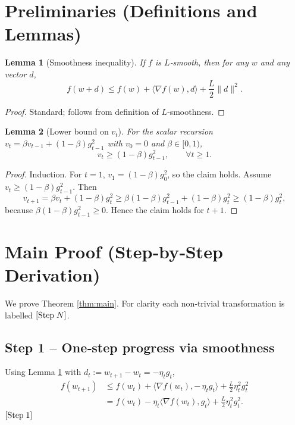 \documentclass{article}
\newtheorem{lemma}{Lemma}
\begin{document}
\newpage

\section*{Preliminaries (Definitions and Lemmas)}
\begin{lemma}[Smoothness inequality]\label{lem:smooth}
If $f$ is $L$‑smooth, then for any $w$ and any vector $d$,
\[
f(w+d) \le f(w)+\langle\nabla f(w),d\rangle+\frac{L}{2}\|d\|^{2}.
\]
\end{lemma}
\begin{proof}
Standard; follows from definition of $L$‑smoothness. \qedhere
\end{proof}

\begin{lemma}[Lower bound on $v_{t}$]\label{lem:vtlb}
For the scalar recursion $v_{t}= \beta v_{t-1}+(1-\beta)g_{t-1}^{2}$ with $v_{0}=0$ and $\beta\in[0,1)$,
\[
v_{t}\ge (1-\beta)g_{t-1}^{2},\qquad\forall t\ge1.
\]
\end{lemma}
\begin{proof}
Induction. For $t=1$, $v_{1}= (1-\beta)g_{0}^{2}$, so the claim holds.  
Assume $v_{t}\ge (1-\beta)g_{t-1}^{2}$. Then
\[
v_{t+1}= \beta v_{t}+(1-\beta)g_{t}^{2}\ge \beta(1-\beta)g_{t-1}^{2}+(1-\beta)g_{t}^{2}\ge (1-\beta)g_{t}^{2},
\]
because $\beta(1-\beta)g_{t-1}^{2}\ge0$.  Hence the claim holds for $t+1$. \qedhere
\end{proof}

\section*{Main Proof (Step‑by‑Step Derivation)}
We prove Theorem \ref{thm:main}. For clarity each non‑trivial transformation is labelled \([{\rm Step}\;N]\).

\subsection*{Step 1 – One‑step progress via smoothness}
Using Lemma \ref{lem:smooth} with $d_{t}:=w_{t+1}-w_{t}= -\eta_{t}g_{t}$,
\[
\begin{aligned}
f(w_{t+1})
&\le f(w_{t})+\langle\nabla f(w_{t}),-\,\eta_{t}g_{t}\rangle
     +\frac{L}{2}\eta_{t}^{2}g_{t}^{2}                              \\
&= f(w_{t})-\eta_{t}\langle\nabla f(w_{t}),g_{t}\rangle
     +\frac{L}{2}\eta_{t}^{2}g_{t}^{2}.                \tag{2}
\end{aligned}
\]
\([{\rm Step}\;1]\)
\end{document}
